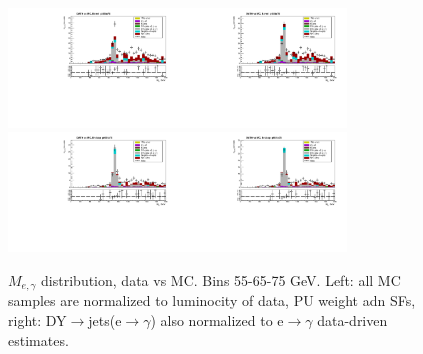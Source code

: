 \begin{figure}[htb]
\begin{center}
    \includegraphics[width=0.40\textwidth]{../figs/figs_v11/ELECTRON_WGamma/PrepareYields/c_TotalDATAvsMC_Barrel__Mpholep1PRELIMINARY_FOR_E_TO_GAMMA_WITH_PSV_CUT_pt65to75_.pdf}\includegraphics[width=0.40\textwidth]{../figs/figs_v11/ELECTRON_WGamma/PrepareYields/c_TotalDATAvsMC_Barrel__Mpholep1PRELIMINARY_FOR_E_TO_GAMMA_WITH_PSV_CUT_pt65to75__etogScale.pdf}\\
    \includegraphics[width=0.40\textwidth]{../figs/figs_v11/ELECTRON_WGamma/PrepareYields/c_TotalDATAvsMC_Endcap__Mpholep1PRELIMINARY_FOR_E_TO_GAMMA_WITH_PSV_CUT_pt65to75_.pdf}\includegraphics[width=0.40\textwidth]{../figs/figs_v11/ELECTRON_WGamma/PrepareYields/c_TotalDATAvsMC_Endcap__Mpholep1PRELIMINARY_FOR_E_TO_GAMMA_WITH_PSV_CUT_pt65to75__etogScale.pdf}\\
   \label{fig:Mpholep1DatavsMC_35to75}
  \caption{$M_{e,\gamma}$ distribution, data vs MC. Bins 55-65-75 GeV. Left: all MC samples are normalized to luminocity of data, PU weight adn SFs, right: DY$\rightarrow$jets(e$\rightarrow\gamma$) also normalized to e$\rightarrow\gamma$ data-driven estimates.}
  \end{center}
\end{figure}

